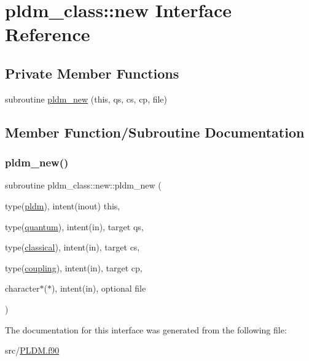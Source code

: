 \hypertarget{interfacepldm__class_1_1new}{}\section{pldm\+\_\+class\+:\+:new Interface Reference}
\label{interfacepldm__class_1_1new}
\subsection*{Private Member Functions}
\begin{DoxyCompactItemize}
\item 
subroutine \hyperlink{interfacepldm__class_1_1new_aa6f4b74cb2d053245025eb156c9053a5}{pldm\+\_\+new} (this, qs, cs, cp, file)
\end{DoxyCompactItemize}


\subsection{Member Function/\+Subroutine Documentation}
\mbox{\label{interfacepldm__class_1_1new_aa6f4b74cb2d053245025eb156c9053a5}} 
\subsubsection{\texorpdfstring{pldm\+\_\+new()}{pldm\_new()}}
{\footnotesize\ttfamily subroutine pldm\+\_\+class\+::new\+::pldm\+\_\+new (\begin{DoxyParamCaption}\item[{type(\hyperlink{structpldm__class_1_1pldm}{pldm}), intent(inout)}]{this,  }\item[{type(\hyperlink{structquantum__class_1_1quantum}{quantum}), intent(in), target}]{qs,  }\item[{type(\hyperlink{structclassical__class_1_1classical}{classical}), intent(in), target}]{cs,  }\item[{type(\hyperlink{structcoupling__class_1_1coupling}{coupling}), intent(in), target}]{cp,  }\item[{character$\ast$($\ast$), intent(in), optional}]{file }\end{DoxyParamCaption})\hspace{0.3cm}{\ttfamily [private]}}



The documentation for this interface was generated from the following file\+:\begin{DoxyCompactItemize}
\item 
src/\hyperlink{_p_l_d_m_8f90}{P\+L\+D\+M.\+f90}\end{DoxyCompactItemize}
